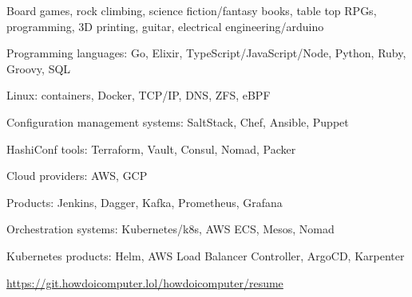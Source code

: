\begin{cventries}
  \cventry
    {}
    {}
    {}
    {}
    {
      \begin{cvitems}
        \item {Board games, rock climbing, science fiction/fantasy books, table top RPGs, programming, 3D printing, guitar, electrical engineering/arduino}
      \end{cvitems}
    }
\end{cventries}

\begin{cventries}
  \cventry
    {}
    {}
    {}
    {}
    {
      \begin{cvitems}
        \item {Programming languages: Go, Elixir, TypeScript/JavaScript/Node, Python, Ruby, Groovy, SQL}
        \item {Linux: containers, Docker, TCP/IP, DNS, ZFS, eBPF}
        \item {Configuration management systems: SaltStack, Chef, Ansible, Puppet}
        \item {HashiConf tools: Terraform, Vault, Consul, Nomad, Packer}
        \item {Cloud providers: AWS, GCP}
        \item {Products: Jenkins, Dagger, Kafka, Prometheus, Grafana}
        \item {Orchestration systems: Kubernetes/k8s, AWS ECS, Mesos, Nomad}
        \item {Kubernetes products: Helm, AWS Load Balancer Controller, ArgoCD, Karpenter}
      \end{cvitems}
    }
\end{cventries}

\begin{cventries}
  \cventry
    {}
    {}
    {}
    {}
    {
      \begin{cvitems}
        \item \href{https://git.howdoicomputer.lol/howdoicomputer/resume}{https://git.howdoicomputer.lol/howdoicomputer/resume}
      \end{cvitems}
    }
\end{cventries}
